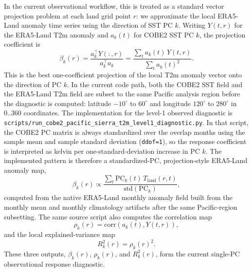 \documentclass[11pt]{article}
\newcommand{\pc}[1]{\mathrm{PC}_{#1}}
\begin{document}
In the current observational workflow, this is treated as a standard vector projection problem at
each land grid point $r$: we approximate the local ERA5-Land anomaly time series using the direction
of SST PC $k$. Writing $Y(t,r)$ for the ERA5-Land T2m anomaly and $a_k(t)$ for COBE2 SST PC $k$,
the projection coefficient is
\begin{equation}
\beta_k(r) = \frac{a_k^\top Y(:,r)}{a_k^\top a_k}
= \frac{\sum_t a_k(t)\,Y(t,r)}{\sum_t a_k(t)^2}.
\label{eq:beta_projection}
\end{equation}
This is the best one-coefficient projection of the local T2m anomaly vector onto the direction of
PC $k$. In the current code path, both the COBE2 SST field and the ERA5-Land T2m field are subset
to the same Pacific analysis region before the diagnostic is computed:
latitude $-10^\circ$ to $60^\circ$ and longitude $120^\circ$ to $280^\circ$ in $0..360$
coordinates. The implementation for the level-1 observed diagnostic is
\texttt{scripts/run\_cobe2\_pacific\_sierra\_t2m\_level1\_diagnostic.py}. In that script, the COBE2
PC matrix is always standardized over the overlap months using the sample mean and sample standard
deviation (\texttt{ddof=1}), so the response coefficient is interpreted as kelvin per
one-standard-deviation increase in PC $k$. The implemented pattern is therefore a standardized-PC,
projection-style ERA5-Land anomaly map,
\begin{equation}
\beta_k(r) \propto \frac{\sum_t \pc{k}(t)\,T_{\mathrm{land}}(r,t)}{\mathrm{std}(\pc{k})},
\label{eq:beta_weighted_pattern}
\end{equation}
computed from the native ERA5-Land monthly anomaly field built from the monthly mean and monthly
climatology artifacts after the same Pacific-region subsetting. The same source script also computes
the correlation map
\begin{equation}
\rho_k(r) = \mathrm{corr}\!\left(a_k(t), Y(t,r)\right),
\label{eq:rho_projection}
\end{equation}
and the local explained-variance map
\begin{equation}
R_k^2(r) = \rho_k(r)^2.
\label{eq:r2_projection}
\end{equation}
These three outputs, $\beta_k(r)$, $\rho_k(r)$, and $R_k^2(r)$, form the current single-PC
observational response diagnostic.
\end{document}
